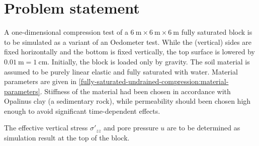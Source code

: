 \section{Problem statement}
\label{fully-saturated-undrained-compression:sec:problem-statement}

A one-dimensional compression test of a $\SI{6}{\metre} \times \SI{6}{\metre}
    \times \SI{6}{\metre}$ fully saturated block is to be simulated as a variant of
an Oedometer test. While the (vertical) sides are fixed horizontally and the
bottom is fixed vertically, the top surface is lowered by
$\SI{0.01}{\metre}=\SI{1}{\centi\metre}$. Initially, the block is loaded only
by gravity. The soil material is assumed to be purely linear elastic and fully
saturated with water. Material parameters are given in
\autoref{fully-saturated-undrained-compression:material-parameters}. Stiffness
of the material had been chosen in accordance with Opalinus clay (a sedimentary
rock), while permeability should been chosen high enough to avoid significant
time-dependent effects.

The effective vertical stress $\sigma'_{zz}$ and pore pressure $u$ are to be
determined as simulation result at the top of the block.

